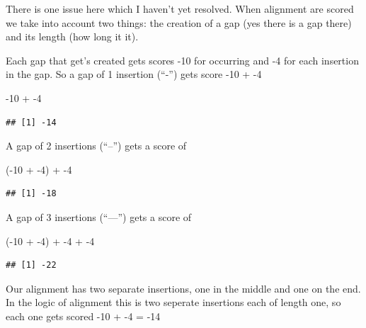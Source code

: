 \documentclass[
]{book}
\newenvironment{Shaded}{\begin{snugshade}}{\end{snugshade}}
\newcommand{\DecValTok}[1]{\textcolor[rgb]{0.00,0.00,0.81}{#1}}
\newcommand{\NormalTok}[1]{#1}
\newcommand{\SpecialCharTok}[1]{\textcolor[rgb]{0.00,0.00,0.00}{#1}}
\begin{document}
There is one issue here which I haven't yet resolved. When alignment are scored we take into account two things: the creation of a gap (yes there is a gap there) and its length (how long it it).

Each gap that get's created gets scores -10 for occurring and -4 for each insertion in the gap. So a gap of 1 insertion (``-'') gets score -10 + -4

\begin{Shaded}
\begin{Highlighting}[]
\SpecialCharTok{{-}}\DecValTok{10} \SpecialCharTok{+} \SpecialCharTok{{-}}\DecValTok{4}
\end{Highlighting}
\end{Shaded}

\begin{verbatim}
## [1] -14
\end{verbatim}

A gap of 2 insertions (``--'') gets a score of

\begin{Shaded}
\begin{Highlighting}[]
\NormalTok{(}\SpecialCharTok{{-}}\DecValTok{10} \SpecialCharTok{+} \SpecialCharTok{{-}}\DecValTok{4}\NormalTok{) }\SpecialCharTok{+} \SpecialCharTok{{-}}\DecValTok{4}
\end{Highlighting}
\end{Shaded}

\begin{verbatim}
## [1] -18
\end{verbatim}

A gap of 3 insertions (``---'') gets a score of

\begin{Shaded}
\begin{Highlighting}[]
\NormalTok{(}\SpecialCharTok{{-}}\DecValTok{10} \SpecialCharTok{+} \SpecialCharTok{{-}}\DecValTok{4}\NormalTok{) }\SpecialCharTok{+} \SpecialCharTok{{-}}\DecValTok{4} \SpecialCharTok{+} \SpecialCharTok{{-}}\DecValTok{4}
\end{Highlighting}
\end{Shaded}

\begin{verbatim}
## [1] -22
\end{verbatim}

Our alignment has two separate insertions, one in the middle and one on the end. In the logic of alignment this is two seperate insertions each of length one, so each one gets scored -10 + -4 = -14
\end{document}
